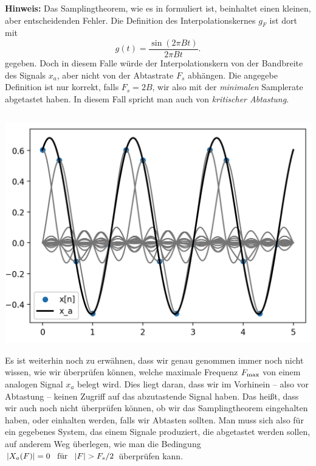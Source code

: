 \textbf{Hinweis:} Das Samplingtheorem, wie es in \cite{proakis2013} formuliert ist, beinhaltet einen kleinen, aber entscheidenden Fehler. Die Definition des Interpolationskernes $g_F$ ist dort mit
\[
g(t) = \frac{\sin(2 \pi B t)}{2 \pi B t}.
\]
gegeben. 
Doch in diesem Falle würde der Interpolationskern von der Bandbreite des Signals $x_a$, aber nicht von der Abtastrate $F_s$ abhängen. 
Die angegebe Definition ist nur korrekt, falls $F_s = 2 B$, wir also mit der \emph{minimalen} Samplerate abgetastet haben.
In diesem Fall spricht man auch von \emph{kritischer Abtastung}.
%
\begin{listing}
    \begin{minipage}{0.49\textwidth}
        \strut\vspace*{-\baselineskip}\newline
        \inputminted[firstline=4,lastline=51]{python3}{code/sampling_theorem.py}
    \end{minipage}
    \begin{minipage}{0.49\textwidth}
        \strut\vspace*{-\baselineskip}\newline
        \includegraphics[width=\textwidth]{code/sampling_theorem.png}
    \end{minipage}
    \label{py:sampling_theorem}
\end{listing}

Es ist weiterhin noch zu erwähnen, dass wir genau genommen immer noch nicht wissen, wie wir überprüfen können, welche maximale Frequenz $F_{\rm max}$ von einem analogen Signal $x_a$ belegt wird.
Dies liegt daran, dass wir im Vorhinein -- also vor Abtastung -- keinen Zugriff auf das abzutastende Signal haben.
Das heißt, dass wir auch noch nicht überprüfen können, ob wir das Samplingtheorem eingehalten haben, oder einhalten werden, falls wir Abtasten sollten.
Man muss sich also für ein gegebenes System, das einem Signale produziert, die abgetastet werden sollen, auf anderem Weg überlegen, wie man die Bedingung ${\left| X_a(F) \right|} = 0 {\hspace{3mm} \text{für} \hspace{3mm}} {\left| F \right|} > F_s/2$ überprüfen kann.

\FloatBarrier
